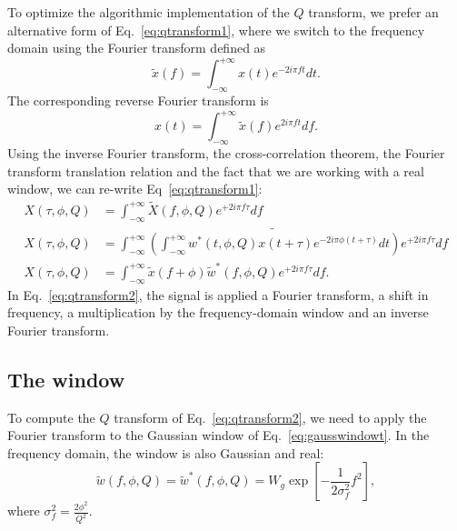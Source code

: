 To optimize the algorithmic implementation of the $Q$ transform, we prefer an alternative form of Eq.~\ref{eq:qtransform1}, where we switch to the frequency domain using the Fourier transform defined as
\begin{equation}
  \tilde{x}(f) = \int_{-\infty}^{+\infty}{ x(t) e^{-2i\pi f t}dt}. \label{eq:FTforward}
\end{equation}
The corresponding reverse Fourier transform is
\begin{equation}
  x(t) = \int_{-\infty}^{+\infty}{ \tilde{x}(f) e^{2i\pi f t}df}.  \label{eq:FTbackward}
\end{equation}
Using the inverse Fourier transform, the cross-correlation theorem, the Fourier transform translation relation and the fact that we are working with a real window, we can re-write Eq~\ref{eq:qtransform1}:
\begin{align}
  X(\tau, \phi, Q) &= \int_{-\infty}^{+\infty}{\tilde{X}(f,\phi,Q) e^{+2i\pi f \tau}df} \\
  X(\tau, \phi, Q) &= \int_{-\infty}^{+\infty}{ \widetilde{\left (\int_{-\infty}^{+\infty}{w^*(t,\phi,Q)x(t+\tau)e^{-2i\pi\phi(t+\tau)}dt}\right)} e^{+2i\pi f \tau}df}\\
  X(\tau, \phi, Q) &= \int_{-\infty}^{+\infty}{ \tilde{x}(f+\phi) \tilde{w}^{*}(f,\phi,Q) e^{+2i\pi f \tau}df}.
  \label{eq:qtransform2}
\end{align}
In Eq.~\ref{eq:qtransform2}, the signal is applied a Fourier transform, a shift in frequency, a multiplication by the frequency-domain window and an inverse Fourier transform.


\subsection{The window} \label{sec:method:window}
To compute the $Q$ transform of Eq.~\ref{eq:qtransform2}, we need to apply the Fourier transform to the Gaussian window of Eq.~\ref{eq:gausswindowt}. In the frequency domain, the window is also Gaussian and real:
\begin{equation}
  \tilde{w}(f,\phi,Q) = \tilde{w}^*(f,\phi,Q) = W_g\exp\left [ -\frac{1}{2\sigma_f^2}f^2 \right],
  \label{eq:gausswindowf}
\end{equation}
where $\sigma_f^2=\frac{2\phi^2}{Q^2}$.

